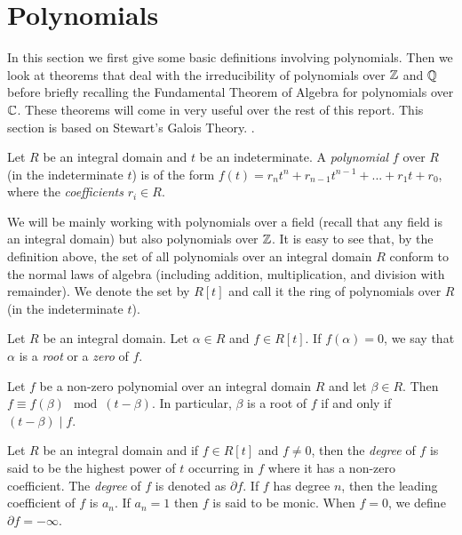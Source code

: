 

\section{Polynomials}
In this section we first give some basic definitions involving polynomials. Then we look at theorems that deal with the irreducibility of polynomials over $\mathbb Z$ and $\mathbb Q$ before briefly recalling the Fundamental Theorem of Algebra for polynomials over $\mathbb C$. These theorems will come in very useful over the rest of this report. This section is based on Stewart's Galois Theory. \cite{Stewart}. 

\begin{definition}
    Let $R$ be an integral domain and $t$ be an indeterminate. A \textit{polynomial} $f$ over $R$ (in the indeterminate $t$) is of the form $f(t) = r_n t^n + r_{n-1} t^{n-1} + ... + r_1 t + r_0$, where the \textit{coefficients} $r_i \in R$. 
\end{definition}

We will be mainly working with polynomials over a field (recall that any field is an integral domain) but also polynomials over $\mathbb Z$. It is easy to see that, by the definition above, the set of all polynomials over an integral domain $R$ conform to  the normal laws of algebra (including addition, multiplication, and division with remainder). We denote the set by $R[t]$ and call it the ring of polynomials over $R$ (in the indeterminate $t$). 

\begin{definition}
	Let $R$ be an integral domain. Let $\alpha \in R$ and $f \in R[t]$. If $f(\alpha) = 0$, we say that $\alpha$ is a \textit{root} or a \textit{zero} of $f$. 
\end{definition}

\begin{theorem} \label{thm:remainder}
	Let $f$ be a non-zero polynomial over an integral domain $R$ and let $\beta \in R$. Then $f \equiv f(\beta) \mod (t - \beta)$. 
	In particular, $\beta$ is a root of $f$ if and only if $(t - \beta) \mid f$. 
\end{theorem}


\begin{definition}
    Let $R$ be an integral domain and if $f \in R[t]$ and $f \neq 0$, then the \textit{degree} of $f$ is said to be the highest power of $t$ occurring in $f$ where it has a non-zero coefficient. The \textit{degree} of $f$ is denoted as $\partial f$. If $f$ has degree $n$, then the leading coefficient of $f$ is $a_n$. If $a_n = 1$ then $f$ is said to be monic. When $f = 0$, we define $\partial f = - \infty$.
\end{definition}


